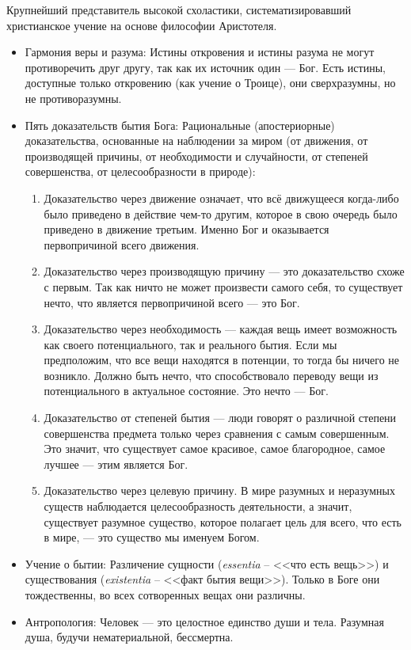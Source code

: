 \documentclass[12pt,a4paper]{article}
\begin{document}
	Крупнейший представитель высокой схоластики, систематизировавший христианское учение на основе философии Аристотеля.
	\begin{itemize}
		\item Гармония веры и разума: Истины откровения и истины разума не могут противоречить друг другу, так как их источник один — Бог. Есть истины, доступные только откровению (как учение о Троице), они сверхразумны, но не противоразумны.
		\item Пять доказательств бытия Бога: Рациональные (апостериорные) доказательства, основанные на наблюдении за миром (от движения, от производящей причины, от необходимости и случайности, от степеней совершенства, от целесообразности в природе):
		\begin{enumerate}
			\item Доказательство через движение означает, что всё движущееся когда-либо было приведено в действие чем-то другим, которое в свою очередь было приведено в движение третьим. Именно Бог и оказывается первопричиной всего движения.
			
			\item Доказательство через производящую причину — это доказательство схоже с первым. Так как ничто не может произвести самого себя, то существует нечто, что является первопричиной всего — это Бог.
			
			\item Доказательство через необходимость — каждая вещь имеет возможность как своего потенциального, так и реального бытия. Если мы предположим, что все вещи находятся в потенции, то тогда бы ничего не возникло. Должно быть нечто, что способствовало переводу вещи из потенциального в актуальное состояние. Это нечто — Бог.
			
			\item Доказательство от степеней бытия — люди говорят о различной степени совершенства предмета только через сравнения с самым совершенным. Это значит, что существует самое красивое, самое благородное, самое лучшее — этим является Бог.
			
			\item Доказательство через целевую причину. В мире разумных и неразумных существ наблюдается целесообразность деятельности, а значит, существует разумное существо, которое полагает цель для всего, что есть в мире, — это существо мы именуем Богом.
		\end{enumerate}
		\item Учение о бытии: Различение сущности (\textit{essentia} -- <<что есть вещь>>) и существования (\textit{existentia} -- <<факт бытия вещи>>). Только в Боге они тождественны, во всех сотворенных вещах они различны.
		\item Антропология: Человек — это целостное единство души и тела. Разумная душа, будучи нематериальной, бессмертна.
	\end{itemize}
	
\end{document}
